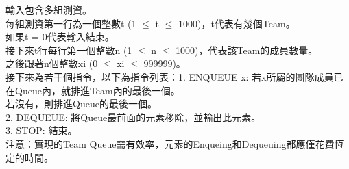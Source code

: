 輸入包含多組測資。\\
每組測資第一行為一個整數t (1 $\leq$ t $\leq$ 1000)，t代表有幾個Team。\\
如果t = 0代表輸入結束。\\
接下來t行每行第一個整數n (1 $\leq$ n $\leq$ 1000)，代表該Team的成員數量。\\
之後跟著n個整數xi (0 $\leq$ xi $\leq$ 999999)。\\
接下來為若干個指令，以下為指令列表：1. ENQUEUE x: 若x所屬的團隊成員已在Queue內，就排進Team內的最後一個。\\
若沒有，則排進Queue的最後一個。\\
2. DEQUEUE: 將Queue最前面的元素移除，並輸出此元素。\\
3. STOP: 結束。\\
注意：實現的Team Queue需有效率，元素的Enqueing和Dequeuing都應僅花費恆定的時間。\\
